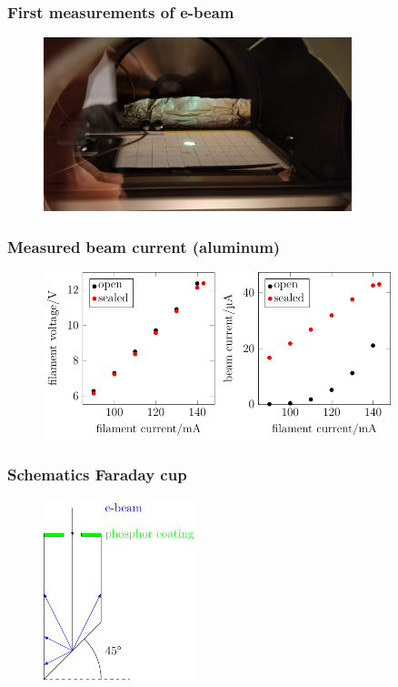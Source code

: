 \documentclass[aspectratio=169]{beamer}
\begin{document}
\begin{frame}
	\frametitle{First measurements of e-beam}
	\begin{figure}[h]
		\centering
		\includegraphics[width=0.8\textwidth]{../Chapters/beam-characterization/center_image}
	\end{figure}
\end{frame}


\begin{frame}
	\frametitle{Measured beam current (aluminum)}
	\begin{figure}[h]
		\centering
		\includegraphics[width=0.9\textwidth]{../Figures/Thesis-figure3.pdf}
	\end{figure}
\end{frame}


\begin{frame}
	\frametitle{Schematics Faraday cup}
	\begin{figure}[h]
		\centering
		\includegraphics[width=0.4\textwidth]{../Figures/Thesis-figure4.pdf}
	\end{figure}
\end{frame}
\end{document}
